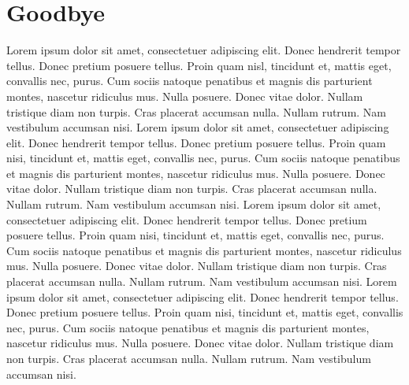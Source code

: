 \documentclass[12pt]{report}
\begin{document}
\chapter{Goodbye}

Lorem ipsum dolor sit amet, consectetuer adipiscing elit. Donec
hendrerit tempor tellus. Donec pretium posuere tellus. Proin quam
nisl, tincidunt et, mattis eget, convallis nec, purus. Cum sociis
natoque penatibus et magnis dis parturient montes, nascetur ridiculus
mus. Nulla posuere. Donec vitae dolor. Nullam tristique diam non
turpis. Cras placerat accumsan nulla. Nullam rutrum. Nam vestibulum
accumsan nisi.  Lorem ipsum dolor sit amet, consectetuer adipiscing
elit. Donec hendrerit tempor tellus. Donec pretium posuere
tellus. Proin quam nisi, tincidunt et, mattis eget, convallis nec,
purus. Cum sociis natoque penatibus et magnis dis parturient montes,
nascetur ridiculus mus. Nulla posuere. Donec vitae dolor. Nullam
tristique diam non turpis. Cras placerat accumsan nulla. Nullam
rutrum. Nam vestibulum accumsan nisi.  Lorem ipsum dolor sit amet,
consectetuer adipiscing elit. Donec hendrerit tempor tellus. Donec
pretium posuere tellus. Proin quam nisi, tincidunt et, mattis eget,
convallis nec, purus. Cum sociis natoque penatibus et magnis dis
parturient montes, nascetur ridiculus mus. Nulla posuere. Donec vitae
dolor. Nullam tristique diam non turpis. Cras placerat accumsan
nulla. Nullam rutrum. Nam vestibulum accumsan nisi.  Lorem ipsum dolor
sit amet, consectetuer adipiscing elit. Donec hendrerit tempor
tellus. Donec pretium posuere tellus. Proin quam nisi, tincidunt et,
mattis eget, convallis nec, purus. Cum sociis natoque penatibus et
magnis dis parturient montes, nascetur ridiculus mus. Nulla
posuere. Donec vitae dolor. Nullam tristique diam non turpis. Cras
placerat accumsan nulla. Nullam rutrum. Nam vestibulum accumsan nisi.
\end{document}
